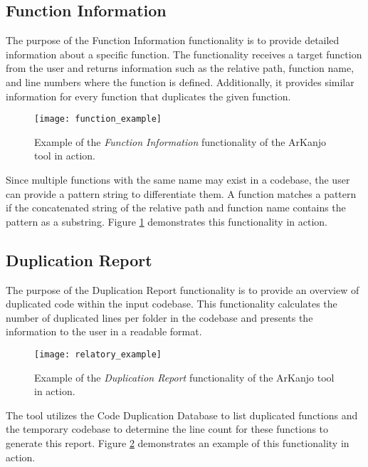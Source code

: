 \subsection{Function Information}
\label{subsec:functioncommand}

The purpose of the Function Information functionality is to provide detailed information about a specific function. The functionality receives a target function from the user and returns information such as the relative path, function name, and line numbers where the function is defined. Additionally, it provides similar information for every function that duplicates the given function.

\begin{figure}
\texttt{[image: function\_example]}
\caption{Example of the \textit{Function Information} functionality of the ArKanjo tool in action.}
\label{fig:function_ex}
\end{figure}

Since multiple functions with the same name may exist in a codebase, the user can provide a pattern string to differentiate them. A function matches a pattern if the concatenated string of the relative path and function name contains the pattern as a substring. Figure \ref{fig:function_ex} demonstrates this functionality in action.

\subsection{Duplication Report}

The purpose of the Duplication Report functionality is to provide an overview of duplicated code within the input codebase. This functionality calculates the number of duplicated lines per folder in the codebase and presents the information to the user in a readable format. 

\begin{figure}
\texttt{[image: relatory\_example]}
\caption{Example of the \textit{Duplication Report} functionality of the ArKanjo tool in action.}
\label{fig:relatory_ex}
\end{figure}

The tool utilizes the Code Duplication Database to list duplicated functions and the temporary codebase to determine the line count for these functions to generate this report. Figure \ref{fig:relatory_ex} demonstrates an example of this functionality in action.




